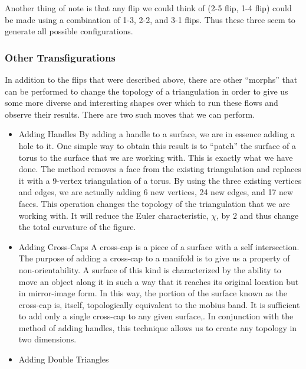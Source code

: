 \documentclass[12pt]{article}
\begin{document}
\noindent Another thing of note is that any flip we could think of (2-5 flip, 1-4 flip) could be made using a combination of 1-3, 2-2, and 3-1 flips. Thus these three seem to generate all possible configurations.
  

\subsubsection{Other Transfigurations}

In addition to the flips that were described above, there are other ``morphs'' that can be performed to change the topology of a triangulation in order to give us some more diverse and interesting shapes over which to run these flows and observe their results. There are two such moves that we can perform.

\begin{itemize}
\item Adding Handles \newline
By adding a handle to a surface, we are in essence adding a hole to it. One simple way to obtain this result is to ``patch'' the surface of a torus to the surface that we are working with. This is exactly what we have done. The method removes a face from the existing triangulation and replaces it with a 9-vertex triangulation of a torus. By using the three existing vertices and edges, we are actually adding 6 new vertices, 24 new edges, and 17 new faces. This operation changes the topology of the triangulation that we are working with. It will reduce the Euler characteristic, $\chi$, by 2 and thus change the total curvature of the figure.
\item Adding Cross-Caps \newline
A cross-cap is a piece of a surface with a self intersection. The purpose of adding a cross-cap to a manifold is to give us a property of non-orientability. A surface of this kind is characterized by the ability to move an object along it in such a way that it reaches its original location but in mirror-image form. In this way, the portion of the surface known as the cross-cap is, itself, topologically equivalent to the mobius band. It is sufficient to add only a single cross-cap to any given surface,. In conjunction with the method of adding handles, this technique allows us to create any topology in two dimensions.
\item Adding Double Triangles \newline

\end{itemize}
\end{document}
